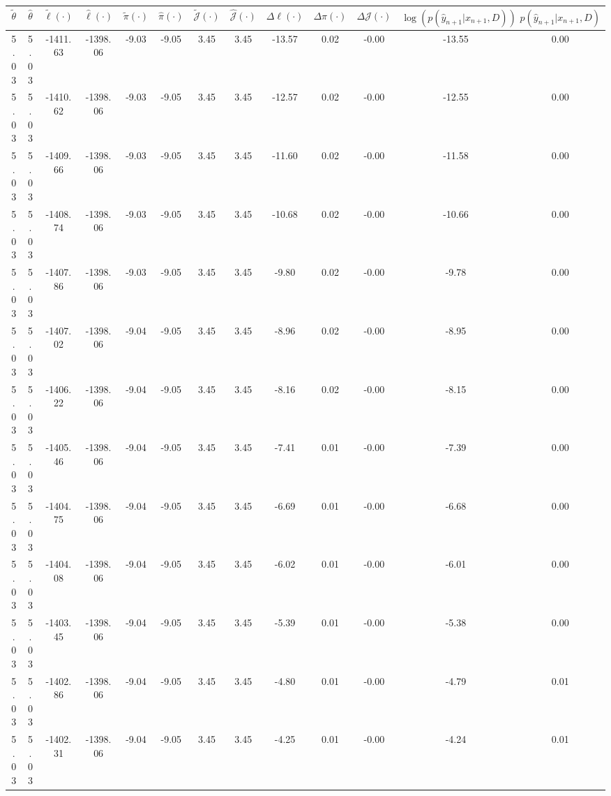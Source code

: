 \begin{table}[htbp]
        \centering
        \tiny
        \begin{adjustbox}{angle=90}
            \begin{tabular}{|c|c|c|c|c|c|c|c|c|c|c|c|c|}
                \hline
                 $\tilde{\theta}$ & $\hat{\theta}$ & $\tilde{\ell}(\cdot)$ & $\hat{\ell}(\cdot)$ & $\tilde{\pi}(\cdot)$ & $\hat{\pi}(\cdot)$ & $\tilde{\mathcal{J}}(\cdot)$ & $\hat{\mathcal{J}}(\cdot)$ & $\Delta \ell(\cdot)$ & $\Delta \pi(\cdot)$ & $\Delta \mathcal{J}(\cdot)$ & $\log(p(\hat{y}_{n+1}|x_{n+1}, D))$ & $p(\hat{y}_{n+1}|x_{n+1}, D)$ \\
                \hline
                 5.03 & 5.03 & -1411.63 & -1398.06 & -9.03 & -9.05 & 3.45 & 3.45 & -13.57 & 0.02 & -0.00 & -13.55 & 0.00\\ \hline
 5.03 & 5.03 & -1410.62 & -1398.06 & -9.03 & -9.05 & 3.45 & 3.45 & -12.57 & 0.02 & -0.00 & -12.55 & 0.00\\ \hline
 5.03 & 5.03 & -1409.66 & -1398.06 & -9.03 & -9.05 & 3.45 & 3.45 & -11.60 & 0.02 & -0.00 & -11.58 & 0.00\\ \hline
 5.03 & 5.03 & -1408.74 & -1398.06 & -9.03 & -9.05 & 3.45 & 3.45 & -10.68 & 0.02 & -0.00 & -10.66 & 0.00\\ \hline
 5.03 & 5.03 & -1407.86 & -1398.06 & -9.03 & -9.05 & 3.45 & 3.45 & -9.80 & 0.02 & -0.00 & -9.78 & 0.00\\ \hline
 5.03 & 5.03 & -1407.02 & -1398.06 & -9.04 & -9.05 & 3.45 & 3.45 & -8.96 & 0.02 & -0.00 & -8.95 & 0.00\\ \hline
 5.03 & 5.03 & -1406.22 & -1398.06 & -9.04 & -9.05 & 3.45 & 3.45 & -8.16 & 0.02 & -0.00 & -8.15 & 0.00\\ \hline
 5.03 & 5.03 & -1405.46 & -1398.06 & -9.04 & -9.05 & 3.45 & 3.45 & -7.41 & 0.01 & -0.00 & -7.39 & 0.00\\ \hline
 5.03 & 5.03 & -1404.75 & -1398.06 & -9.04 & -9.05 & 3.45 & 3.45 & -6.69 & 0.01 & -0.00 & -6.68 & 0.00\\ \hline
 5.03 & 5.03 & -1404.08 & -1398.06 & -9.04 & -9.05 & 3.45 & 3.45 & -6.02 & 0.01 & -0.00 & -6.01 & 0.00\\ \hline
 5.03 & 5.03 & -1403.45 & -1398.06 & -9.04 & -9.05 & 3.45 & 3.45 & -5.39 & 0.01 & -0.00 & -5.38 & 0.00\\ \hline
 5.03 & 5.03 & -1402.86 & -1398.06 & -9.04 & -9.05 & 3.45 & 3.45 & -4.80 & 0.01 & -0.00 & -4.79 & 0.01\\ \hline
 5.03 & 5.03 & -1402.31 & -1398.06 & -9.04 & -9.05 & 3.45 & 3.45 & -4.25 & 0.01 & -0.00 & -4.24 & 0.01\\ \hline

\end{tabular}
\end{adjustbox}
\end{table}
